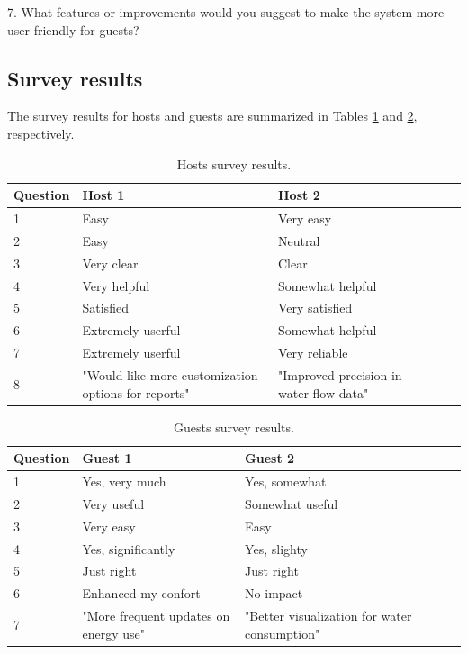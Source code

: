 7. What features or improvements would you suggest to make the system more user-friendly for guests?

\subsection{Survey results}

The survey results for hosts and guests are summarized in Tables \ref{tab:hosts-survey-results} and 
\ref{tab:guests-survey-results}, respectively.

\begin{table}[ht]
    \caption{Hosts survey results.}
    \label{tab:hosts-survey-results}
    \hskip-1.2cm\begin{tabular}{@{}llllll@{}}
    \toprule
    \textbf{Question} & \textbf{Host 1}   & \textbf{Host 2}  \\ \midrule
    1                 & Easy              & Very easy        \\
    2                 & Easy              & Neutral          \\
    3                 & Very clear        & Clear            \\
    4                 & Very helpful      & Somewhat helpful \\
    5                 & Satisfied         & Very satisfied   \\
    6                 & Extremely userful & Somewhat helpful \\
    7                 & Extremely userful & Very reliable    \\
    8                 & "Would like more customization options for reports" & "Improved precision in water flow data" \\ \bottomrule
    \end{tabular}
\end{table}

\begin{table}[ht]
    \caption{Guests survey results.}
    \label{tab:guests-survey-results}
    \hskip-1.2cm\begin{tabular}{@{}llllll@{}}
    \toprule
    \textbf{Question} & \textbf{Guest 1}    & \textbf{Guest 2}  \\ \midrule
    1                 & Yes, very much      & Yes, somewhat     \\
    2                 & Very useful         & Somewhat useful   \\
    3                 & Very easy           & Easy              \\
    4                 & Yes, significantly  & Yes, slighty      \\
    5                 & Just right          & Just right        \\
    6                 & Enhanced my confort & No impact         \\
    7                 & "More frequent updates on energy use" & "Better visualization for water consumption" \\ \bottomrule
    \end{tabular}
\end{table}